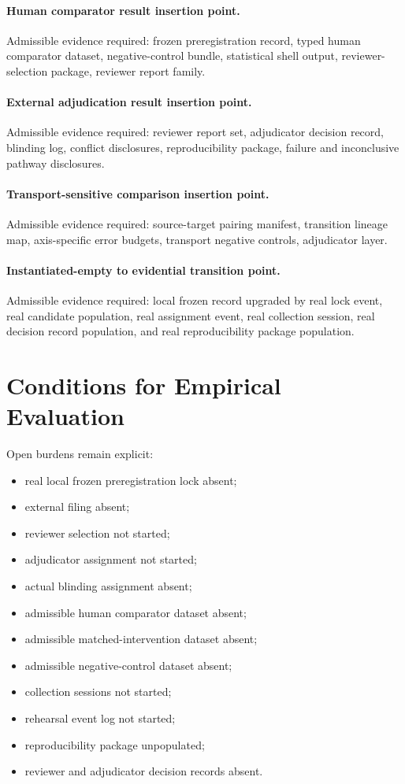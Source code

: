 \documentclass[11pt,a4paper]{article}
\begin{document}
\paragraph{Human comparator result insertion point.}
Admissible evidence required: frozen preregistration record, typed human
comparator dataset, negative-control bundle, statistical shell output,
reviewer-selection package, reviewer report family.

\paragraph{External adjudication result insertion point.}
Admissible evidence required: reviewer report set, adjudicator decision record,
blinding log, conflict disclosures, reproducibility package, failure and
inconclusive pathway disclosures.

\paragraph{Transport-sensitive comparison insertion point.}
Admissible evidence required: source-target pairing manifest, transition
lineage map, axis-specific error budgets, transport negative controls,
adjudicator layer.

\paragraph{Instantiated-empty to evidential transition point.}
Admissible evidence required: local frozen record upgraded by real lock event,
real candidate population, real assignment event, real collection session,
real decision record population, and real reproducibility package population.

\section{Conditions for Empirical Evaluation}



Open burdens remain explicit:

\begin{itemize}
\item real local frozen preregistration lock absent;
\item external filing absent;
\item reviewer selection not started;
\item adjudicator assignment not started;
\item actual blinding assignment absent;
\item admissible human comparator dataset absent;
\item admissible matched-intervention dataset absent;
\item admissible negative-control dataset absent;
\item collection sessions not started;
\item rehearsal event log not started;
\item reproducibility package unpopulated;
\item reviewer and adjudicator decision records absent.
\end{itemize}
\end{document}
